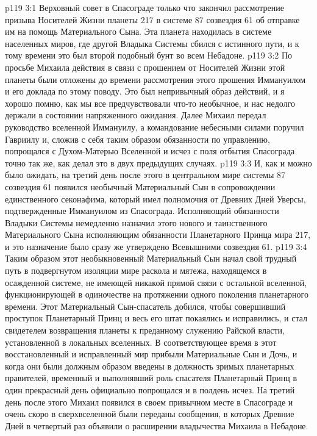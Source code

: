 \vs p119 3:1 Верховный совет в Спасограде только что закончил рассмотрение призыва Носителей Жизни планеты 217 в системе 87 созвездия 61 об отправке им на помощь Материального Сына. Эта планета находилась в системе населенных миров, где другой Владыка Системы сбился с истинного пути, и к тому времени это был второй подобный бунт во всем Небадоне.
\vs p119 3:2 По просьбе Михаила действия в связи с прошением от Носителей Жизни этой планеты были отложены до времени рассмотрения этого прошения Иммануилом и его доклада по этому поводу. Это был непривычный образ действий, и я хорошо помню, как мы все предчувствовали что\hyp{}то необычное, и нас недолго держали в состоянии напряженного ожидания. Далее Михаил передал руководство вселенной Иммануилу, а командование небесными силами поручил Гавриилу и, сложив с себя таким образом обязанности по управлению, попрощался с Духом\hyp{}Матерью Вселенной и исчез с поля отбытия Спасограда точно так же, как делал это в двух предыдущих случаях.
\vs p119 3:3 И, как и можно было ожидать, на третий день после этого в центральном мире системы 87 созвездия 61 появился необычный Материальный Сын в сопровождении единственного секонафима, который имел полномочия от Древних Дней Уверсы, подтвержденные Иммануилом из Спасограда. Исполняющий обязанности Владыки Системы немедленно назначил этого нового и таинственного Материального Сына исполняющим обязанности Планетарного Принца мира 217, и это назначение было сразу же утверждено Всевышними созвездия 61.
\vs p119 3:4 Таким образом этот необыкновенный Материальный Сын начал свой трудный путь в подвергнутом изоляции мире раскола и мятежа, находящемся в осажденной системе, не имеющей никакой прямой связи с остальной вселенной, функционирующей в одиночестве на протяжении одного поколения планетарного времени. Этот Материальный Сын\hyp{}спасатель добился, чтобы совершивший проступок Планетарный Принц и весь его штат покаялись и исправились, и стал свидетелем возвращения планеты к преданному служению Райской власти, установленной в локальных вселенных. В соответствующее время в этот восстановленный и исправленный мир прибыли Материальные Сын и Дочь, и когда они были должным образом введены в должность зримых планетарных правителей, временный и выполнявший роль спасателя Планетарный Принц в один прекрасный день официально попрощался и в полдень исчез. На третий день после этого Михаил появился в своем привычном месте в Спасограде и очень скоро в сверхвселенной были переданы сообщения, в которых Древние Дней в четвертый раз объявили о расширении владычества Михаила в Небадоне.
